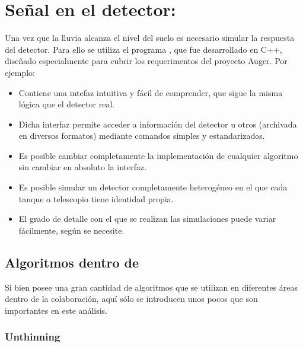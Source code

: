 	\section{Señal en el detector: \Offline{}}
	\label{sc:offline}
	
	Una vez que la lluvia alcanza el nivel del suelo es necesario simular la respuesta del detector.
	Para ello se utiliza el programa \Offline{}, que fue desarrollado en C++, dise\~nado especialmente para cubrir los requerimentos del proyecto Auger. Por ejemplo:
	\begin{itemize}
	\item Contiene una intefaz intuitiva y f\'acil de comprender, que sigue la misma l\'ogica que el detector real.
	\item Dicha interfaz permite acceder a informaci\'on del detector u otros (archivada en diversos formatos) mediante comandos simples y estandarizados.
	\item Es posible cambiar completamente la implementaci\'on de cualquier algoritmo sin cambiar en absoluto la interfaz.
	\item Es posible simular un detector completamente heterog\'eneo en el que cada tanque o telescopio tiene identidad propia.
	\item El grado de detalle con el que se realizan las simulaciones puede variar f\'acilmente, seg\'un se necesite.
	\end{itemize}
	
	\subsection{Algoritmos dentro de \Offline{}}
	
	Si bien \Offline{} posee una gran cantidad de algoritmos que se utilizan en diferentes \'areas dentro de la colaboraci\'on, aqu\'i s\'olo se introducen unos pocos que son importantes en este an\'alisis.
	
		\subsubsection{Unthinning}
		
